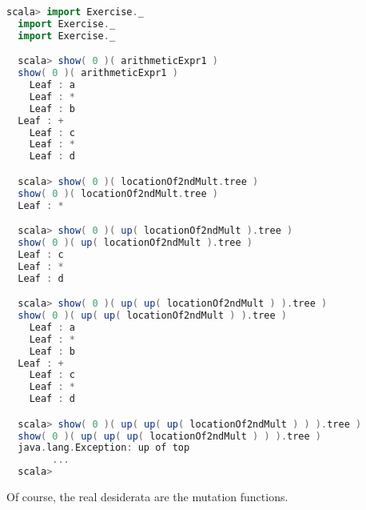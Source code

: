 \begin{lstlisting}[language=Scala,mathescape=true]
  scala> import Exercise._
  import Exercise._
  import Exercise._

  scala> show( 0 )( arithmeticExpr1 )
  show( 0 )( arithmeticExpr1 )
    Leaf : a
    Leaf : *
    Leaf : b
  Leaf : +
    Leaf : c
    Leaf : *
    Leaf : d

  scala> show( 0 )( locationOf2ndMult.tree )
  show( 0 )( locationOf2ndMult.tree )
  Leaf : *

  scala> show( 0 )( up( locationOf2ndMult ).tree )
  show( 0 )( up( locationOf2ndMult ).tree )
  Leaf : c
  Leaf : *
  Leaf : d

  scala> show( 0 )( up( up( locationOf2ndMult ) ).tree )
  show( 0 )( up( up( locationOf2ndMult ) ).tree )
    Leaf : a
    Leaf : *
    Leaf : b
  Leaf : +
    Leaf : c
    Leaf : *
    Leaf : d

  scala> show( 0 )( up( up( up( locationOf2ndMult ) ) ).tree )
  show( 0 )( up( up( up( locationOf2ndMult ) ) ).tree )
  java.lang.Exception: up of top
        ...
  scala> 
\end{lstlisting}

Of course, the real desiderata are the mutation functions.

